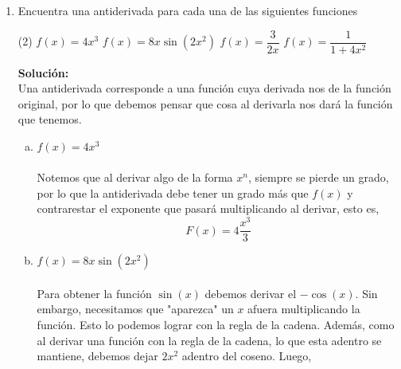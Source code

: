 \documentclass[12pt]{article}
\newenvironment{solucion}
{\begin{mdframed}[backgroundcolor=black!10]
		{\bf Solución:}\\
	}
	{
	\end{mdframed}
}
\newenvironment{preguntas}
{\begin{enumerate}\itemsep12pt
	}
	{
	\end{enumerate}
}
\newcommand{\ra}{\rightarrow}
\begin{document}
\begin{preguntas}
\begin{solucion}
Para la intersección con el eje $X$, hacemos $y = 0$, por lo que
$$1-x_0^2 = -2x_0(x-x_0) \ra x* = \dfrac{1+x_0^2}{2x_0}$$
Donde $x^*$ corresponde a la altura del triangulo\\

Para la intersección con el eje $Y$, hacemos $x = 0$, por lo que
$$y-(1-x_0^2) = 2x_0^2 \ra y* = 1 + x_0^2$$
Donde $y^*$ corresponde a la base del triangulo.\\

Luego, nuestra función área corresponderá a
$$A(x_0) = \dfrac{x^*y^*}{2} = \dfrac{(1+x_0^2)^2}{4x_0}, \ x > 0$$
Derivando,
$$A'(x_0) = \dfrac{(x_0^2)(3x_0^2-1)}{4x_0^2} = 0$$
De donde obtenemos que los puntos críticos son $\dfrac{1}{\sqrt[]{3}}$ y $-\dfrac{1}{\sqrt[]{3}}$. Sin embargo, $x$ debe ser positivo, por lo que el único punto crítico que tenemos es $x = \dfrac{1}{\sqrt[]{3}}$\\
\\
Además, notemos que para $x \in \left(0, \dfrac{1}{\sqrt[]{3}}\right) \ra A'(x) < 0$ y para $x > \dfrac{1}{\sqrt[]{3}} \ra A'(x) > 0$, por lo que $x = \dfrac{1}{\sqrt[]{3}}$ corresponde al área mínima, la cual es
$$A\left(\dfrac{1}{\sqrt[]{3}}\right) = \dfrac{2}{3}$$
\end{solucion}
\item Encuentra una antiderivada para cada una de las siguientes funciones
\begin{tasks}(2)
\task $f(x) = 4x^3$
\task $f(x) = 8x\sin (2x^2)$
\task $f(x) = \dfrac{3}{2x}$
\task $f(x) = \dfrac{1}{1+4x^2}$
\end{tasks}
\begin{solucion}
Una antiderivada corresponde a una función cuya derivada nos de la función original, por lo que debemos pensar que cosa al derivarla nos dará la función que tenemos.
\begin{enumerate}[a)]
\item $f(x) = 4x^3$\\
\\
Notemos que al derivar algo de la forma $x^n$, siempre se pierde un grado, por lo que la antiderivada debe tener un grado más que $f(x)$ y contrarestar el exponente que pasará multiplicando al derivar, esto es,
$$F(x) = 4\dfrac{x^3}{3}$$
\item $f(x) = 8x\sin (2x^2)$\\
\\
Para obtener la función $\sin(x)$ debemos derivar el $-\cos(x)$. Sin embargo, necesitamos que "aparezca" un $x$ afuera multiplicando la función. Esto lo podemos lograr con la regla de la cadena. Además, como al derivar una función con la regla de la cadena, lo que esta adentro se mantiene, debemos dejar $2x^2$ adentro del coseno. Luego,

\end{enumerate}
\end{solucion}
\end{preguntas}
\end{document}
